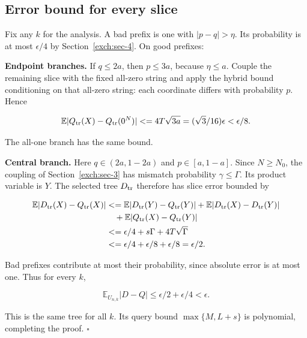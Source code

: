 \subsection{Error bound for every slice}\label{exch:sec-6}

Fix any \(k\) for the analysis. A bad prefix is one with \(|p-q|>\eta\).
Its probability is at most \(\epsilon/4\) by Section~\ref{exch:sec-4}. On good
prefixes:

\textbf{Endpoint branches.} If \(q\le2a\), then \(p\le3a\), because
\(\eta\le a\). Couple the remaining slice with the fixed all-zero string
and apply the hybrid bound conditioning on that all-zero string: each
coordinate differs with probability \(p\). Hence

\[
\mathbb E|Q_{\rm tr}(X)-Q_{\rm tr}(0^N)|
\le4T\sqrt{3a}=(\sqrt3/16)\epsilon<\epsilon/8.
\]

The all-one branch has the same bound.

\textbf{Central branch.} Here \(q\in(2a,1-2a)\) and \(p\in[a,1-a]\).
Since \(N\ge N_0\), the coupling of
Section~\ref{exch:sec-3} has mismatch probability
\(\gamma\le\Gamma\). Its product variable is \(Y\). The selected tree
\(D_{\rm tr}\) therefore has slice error bounded by

\[
\begin{aligned}
\mathbb E|D_{\rm tr}(X)-Q_{\rm tr}(X)|
&\le\mathbb E|D_{\rm tr}(Y)-Q_{\rm tr}(Y)|
+\mathbb E|D_{\rm tr}(X)-D_{\rm tr}(Y)|\\
&\quad+\mathbb E|Q_{\rm tr}(X)-Q_{\rm tr}(Y)|\\
&\le\epsilon/4+s\Gamma+4T\sqrt\Gamma\\
&\le\epsilon/4+\epsilon/8+\epsilon/8=\epsilon/2.
\end{aligned}
\]

Bad prefixes contribute at most their probability, since absolute error
is at most one. Thus for every \(k\),

\[
\mathbb E_{U_{n,k}}|D-Q|\le\epsilon/2+\epsilon/4<\epsilon.
\]

This is the same tree for all \(k\). Its query bound \(\max\{M,L+s\}\)
is polynomial, completing the proof. \(\square\)
